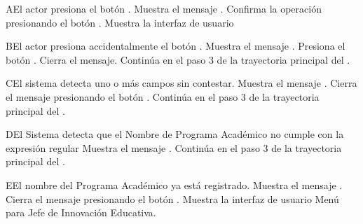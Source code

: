 \begin{UCtrayectoriaA}{A}{El actor presiona el botón .}
    \UCpaso Muestra el mensaje .
    \UCpaso[\UCactor] Confirma la operación presionando el botón .
    \UCpaso Muestra la interfaz de usuario 
\end{UCtrayectoriaA}
\begin{UCtrayectoriaA}{B}{El actor presiona accidentalmente el botón .}
    \UCpaso Muestra el mensaje .
    \UCpaso[\UCactor] Presiona el botón .
    \UCpaso Cierra el mensaje.
    \UCpaso Continúa en el paso 3 de la trayectoria principal del .
\end{UCtrayectoriaA}
\begin{UCtrayectoriaA}{C}{El sistema detecta uno o más campos sin contestar.}
    \UCpaso Muestra el mensaje .
    \UCpaso[\UCactor] Cierra el mensaje presionando el botón .
    \UCpaso Continúa en el paso 3 de la trayectoria principal del .
\end{UCtrayectoriaA}
\begin{UCtrayectoriaA}{D}{El Sistema detecta que el Nombre de Programa Académico no cumple con la expresión regular}
    \UCpaso Muestra el mensaje .
    \UCpaso Continúa en el paso 3 de la trayectoria principal del .
\end{UCtrayectoriaA}

\begin{UCtrayectoriaA}{E}{El nombre del Programa Académico ya está registrado.}
    \UCpaso Muestra el mensaje .
    \UCpaso[\UCactor] Cierra el mensaje presionando el botón .
\UCpaso Muestra la interfaz de usuario Menú para Jefe de Innovación Educativa.
\end{UCtrayectoriaA}


